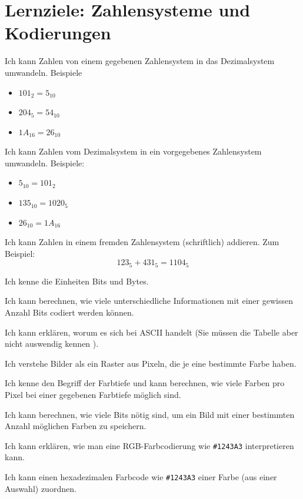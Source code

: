 \section*{Lernziele: Zahlensysteme und Kodierungen}
\begin{todolist}
\item Ich kann Zahlen von einem gegebenen Zahlensystem in das Dezimalsystem umwandeln. Beispiele
\begin{itemize}
\item $101_2 = 5_{10}$
\item $204_5 = 54_{10}$
\item $1A_{16} = 26_{10}$
\end{itemize}
\item Ich kann Zahlen vom Dezimalsystem in ein vorgegebenes Zahlensystem umwandeln. Beispiele:
\begin{itemize}
\item $5_{10} = 101_2$
\item $135_{10}=1020_5$
\item $26_{10}=1A_{16}$
\end{itemize}
\item Ich kann Zahlen in einem fremden Zahlensystem (schriftlich) addieren. Zum Beispiel:
\[123_5 + 431_5 = 1104_5\]
\item Ich kenne die Einheiten Bits und Bytes.
\item Ich kann berechnen, wie viele unterschiedliche Informationen mit einer gewissen Anzahl Bits codiert werden können.
\item Ich kann erklären, worum es sich bei ASCII handelt (Sie müssen die Tabelle aber nicht auswendig kennen ).
\item Ich verstehe Bilder als ein Raster aus Pixeln, die je eine bestimmte Farbe haben.
\item Ich kenne den Begriff der Farbtiefe und kann berechnen, wie viele Farben pro Pixel bei einer gegebenen Farbtiefe möglich sind.
\item Ich kann berechnen, wie viele Bits nötig sind, um ein Bild mit einer bestimmten Anzahl möglichen Farben zu speichern.
\item Ich kann erklären, wie man eine RGB-Farbcodierung wie \texttt{\#1243A3} interpretieren kann.
\item Ich kann einen hexadezimalen Farbcode wie \texttt{\#1243A3} einer Farbe (aus einer Auswahl) zuordnen.
\end{todolist}
